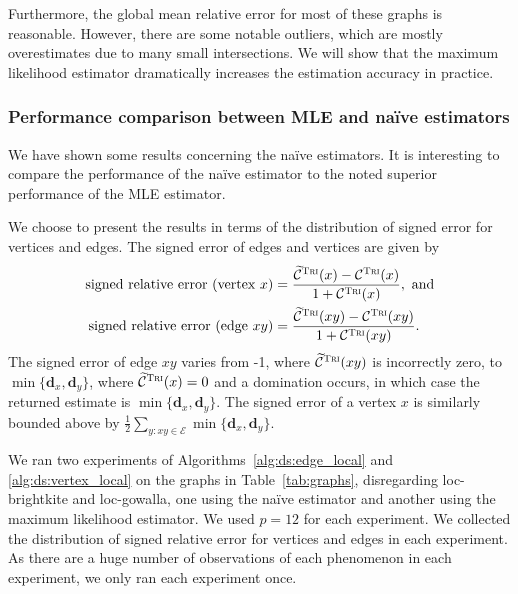 \documentclass[10]{article}
\newcommand{\algoname}[1]{\textnormal{\textsc{#1}}}
\begin{document}
Furthermore, the global mean relative error for most of these graphs is reasonable. 
However, there are some notable outliers, which are mostly overestimates due to many small intersections. 
We will show that the maximum likelihood estimator dramatically increases the estimation accuracy in practice.

\subsubsection{Performance comparison between MLE and na\"ive estimators}

We have shown some results concerning the na\"ive estimators. 
It is interesting to compare the performance of the na\"ive estimator to the noted superior performance of the MLE estimator.

We choose to present the results in terms of the distribution of signed error for vertices and edges. 
The signed error of edges and vertices are given by
%
\begin{align}
\label{eq:vertex_sre}
\text{signed relative error (vertex $x$)} &= \frac{\widetilde{\mathcal{C}}^{\algoname{Tri}}(x) - \mathcal{C}^{\algoname{Tri}}(x)}{1 + \mathcal{C}^{\algoname{Tri}}(x)}, \text{ and} \\
\label{eq:edge_sre}
\text{signed relative error (edge $xy$)} &= \frac{\widetilde{\mathcal{C}}^{\algoname{Tri}}(xy) - \mathcal{C}^{\algoname{Tri}}(xy)}{1 + \mathcal{C}^{\algoname{Tri}}(xy)}.
\end{align}
%
The signed error of edge $xy$ varies from -1, where $\widetilde{\mathcal{C}}^{\algoname{Tri}}(xy)$ is incorrectly zero, to $\min \{ \mathbf{d}_x, \mathbf{d}_y \}$, where $\widetilde{\mathcal{C}}^{\algoname{Tri}}(x) = 0$ and a domination occurs, in which case the returned estimate is $\min \{ \mathbf{d}_x, \mathbf{d}_y \}$.
The signed error of a vertex $x$ is similarly bounded above by $\frac{1}{2} \sum_{y : xy \in \mathcal{E}} \min \{\mathbf{d}_x, \mathbf{d}_y \}$.

We ran two experiments of Algorithms~\ref{alg:ds:edge_local} and \ref{alg:ds:vertex_local} on the graphs in Table~\ref{tab:graphs}, disregarding loc-brightkite and loc-gowalla, one using the na\"ive estimator and another using the maximum likelihood estimator.
We used $p=12$ for each experiment. 
We collected the distribution of signed relative error for vertices and edges in each experiment.
As there are a huge number of observations of each phenomenon in each experiment, we only ran each experiment once.
\end{document}
